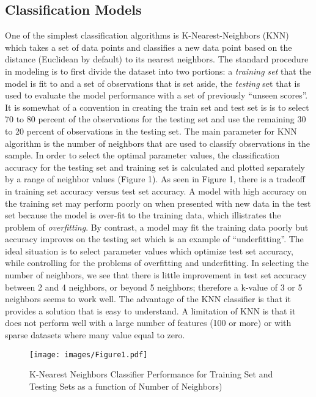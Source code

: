 \documentclass[sigconf]{acmart}
\begin{document}
\subsection{Classification Models} 

One of the simplest classification algorithms is K-Nearest-Neighbors (KNN) 
which takes a set of data points and classifies a new data point based on the 
distance (Euclidean by default) to its nearest neighbors. The standard 
procedure in modeling is to first divide the dataset into two portions: a 
\emph{training set} that the model is fit to and a set of observations that 
is set aside, the \emph{testing} set that is used to evaluate the model
performance with a set of previously ``unseen scores''. It is somewhat of 
a convention in creating the train set and test set is is to select 70 to 
80 percent of the observations for the testing set and use the remaining 
30 to 20 percent of observations in the testing set. The main parameter for 
KNN algorithm is the number of neighbors that are used to classify 
observations in the sample. In order to select the optimal parameter values, 
the classification accuracy for the testing set and training set is 
calculated and plotted separately by a range of neighbor values (Figure 1). 
As seen in Figure 1, there is a tradeoff in training set accuracy versus 
test set accuracy. A model with high accuracy on the training set may perform 
poorly on when presented with new data in the test set because the model 
is over-fit to the training data, which illistrates the problem of 
\emph{overfitting}. By contrast, a model may fit the training data poorly
but accuracy improves on the testing set which is an example of 
``underfitting''. The ideal situation is to select parameter values which
optimize test set accuracy, while controlling for the problems of 
overfitting and underfitting. In selecting the number of neighbors, we
see that there is little improvement in test set accuracy between 2 and
4 neighbors, or beyond 5 neighbors; therefore a k-value of 3 or 5
neighbors seems to work well. The advantage of the KNN classifier is that 
it provides a solution that is easy to understand. A limitation of KNN is 
that it does not perform well with a large number of features (100 or more) 
or with sparse datasets where many value equal to zero. 

\begin{figure}[!ht]
  \centering\texttt{[image: images/Figure1.pdf]}
  \caption{K-Nearest Neighbors Classifier Performance for Training Set and 
  Testing Sets as a function of Number of Neighbors)}
  \label{f:Figure1}
\end{figure}
\end{document}
